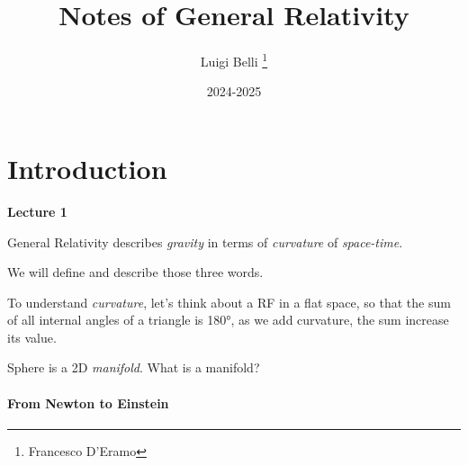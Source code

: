 \documentclass{report}
\title{Notes of  General Relativity}
\author{{Luigi Belli}
	\thanks{Francesco D'Eramo}}
\date{2024-2025}
\begin{document}
\maketitle
\tableofcontents

\chapter{Introduction}

\textbf{Lecture 1}

General Relativity describes \emph{gravity} in terms of \emph{curvature} of \emph{space-time}.

We will define and describe those three words. 

To understand \emph{curvature}, let's think about a RF in a flat space, so that the sum of all internal angles of a triangle is 180°, as we add curvature, the sum increase its value.

Sphere is a 2D \emph{manifold}. {\tiny What is a manifold?}

\subsubsection{From Newton to Einstein}
\end{document}
